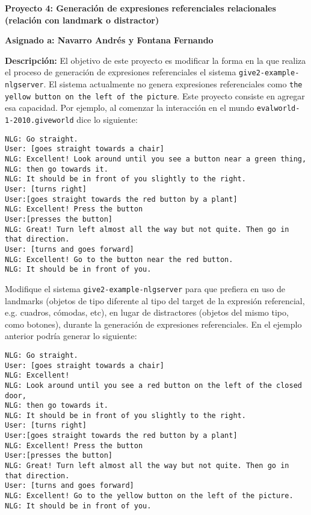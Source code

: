 \documentclass{article}
\begin{document}
\bigskip
\noindent
\textbf{Proyecto 4: Generaci\'on de expresiones referenciales relacionales (relaci\'on con landmark o distractor)} 

\textbf{Asignado a: Navarro Andr\'es y Fontana Fernando}

\textbf{Descripci\'on:}
El objetivo de este proyecto es modificar la forma en la que realiza el proceso de generaci\'on de expresiones referenciales el sistema \texttt{give2-example-nlgserver}. El sistema actualmente no genera expresiones referenciales como \texttt{the yellow button on the left of the picture}. Este proyecto consiste en agregar esa capacidad. Por ejemplo, al comenzar la interacci\'on en el mundo \texttt{evalworld-1-2010.giveworld} dice lo siguiente: 

\begin{verbatim}
NLG: Go straight. 
User: [goes straight towards a chair]
NLG: Excellent! Look around until you see a button near a green thing, 
NLG: then go towards it. 
NLG: It should be in front of you slightly to the right. 
User: [turns right]
User:[goes straight towards the red button by a plant]
NLG: Excellent! Press the button
User:[presses the button]
NLG: Great! Turn left almost all the way but not quite. Then go in that direction. 
User: [turns and goes forward]
NLG: Excellent! Go to the button near the red button. 
NLG: It should be in front of you. 
\end{verbatim}

Modifique el sistema \texttt{give2-example-nlgserver} para que prefiera en uso de landmarks (objetos de tipo diferente al tipo del target de la expresi\'on referencial, e.g. cuadros, c\'omodas, etc), en lugar de distractores (objetos del mismo tipo, como botones), durante la generaci\'on de expresiones referenciales. En el ejemplo anterior podr\'ia generar lo siguiente:

\begin{verbatim}
NLG: Go straight. 
User: [goes straight towards a chair]
NLG: Excellent! 
NLG: Look around until you see a red button on the left of the closed door, 
NLG: then go towards it. 
NLG: It should be in front of you slightly to the right. 
User: [turns right]
User:[goes straight towards the red button by a plant]
NLG: Excellent! Press the button
User:[presses the button]
NLG: Great! Turn left almost all the way but not quite. Then go in that direction. 
User: [turns and goes forward]
NLG: Excellent! Go to the yellow button on the left of the picture. 
NLG: It should be in front of you. 
\end{verbatim}
\end{document}
